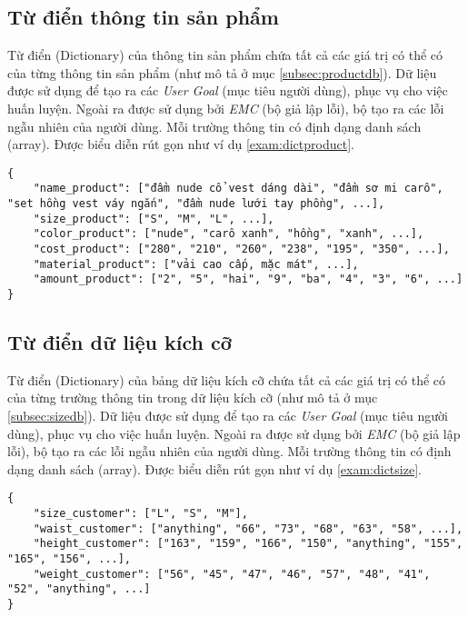 \subsection{Từ điển thông tin sản phẩm}
Từ điển (Dictionary) của thông tin sản phẩm chứa tất cả các giá trị có thể có của từng thông tin sản phẩm (như mô tả ở mục \ref{subsec:productdb}). Dữ liệu được sử dụng để tạo ra các \textit{User Goal} (mục tiêu người dùng), phục vụ cho việc huấn luyện. Ngoài ra được sử dụng bởi \textit{EMC} (bộ giả lập lỗi), bộ tạo ra các lỗi ngẫu nhiên của người dùng. Mỗi trường thông tin có định dạng danh sách (array). Được biểu diễn rút gọn như ví dụ \ref{exam:dictproduct}.

\renewcommand{\lstlistingname}{Ví dụ}
\begin{lstlisting}[caption={Từ điển thông tin sản phẩm},label={exam:dictproduct},language=code_vn,firstnumber=1]
{
    "name_product": ["đầm nude cổ vest dáng dài", "đầm sơ mi carô", "set hồng vest váy ngắn", "đầm nude lưới tay phồng", ...],
    "size_product": ["S", "M", "L", ...],
    "color_product": ["nude", "carô xanh", "hồng", "xanh", ...],
    "cost_product": ["280", "210", "260", "238", "195", "350", ...],
    "material_product": ["vải cao cấp, mặc mát", ...],
    "amount_product": ["2", "5", "hai", "9", "ba", "4", "3", "6", ...]
}
\end{lstlisting}

\subsection{Từ điển dữ liệu kích cỡ}
Từ điển (Dictionary) của bảng dữ liệu kích cỡ chứa tất cả các giá trị có thể có của từng trường thông tin trong dữ liệu kích cỡ (như mô tả ở mục \ref{subsec:sizedb}). Dữ liệu được sử dụng để tạo ra các \textit{User Goal} (mục tiêu người dùng), phục vụ cho việc huấn luyện. Ngoài ra được sử dụng bởi \textit{EMC} (bộ giả lập lỗi), bộ tạo ra các lỗi ngẫu nhiên của người dùng. Mỗi trường thông tin có định dạng danh sách (array). Được biểu diễn rút gọn như ví dụ \ref{exam:dictsize}.

\renewcommand{\lstlistingname}{Ví dụ}
\begin{lstlisting}[caption={Từ điển dữ liệu kích cỡ},label={exam:dictsize},language=code_vn,firstnumber=1]
{
    "size_customer": ["L", "S", "M"],
    "waist_customer": ["anything", "66", "73", "68", "63", "58", ...],
    "height_customer": ["163", "159", "166", "150", "anything", "155", "165", "156", ...],
    "weight_customer": ["56", "45", "47", "46", "57", "48", "41", "52", "anything", ...]
}
\end{lstlisting}

